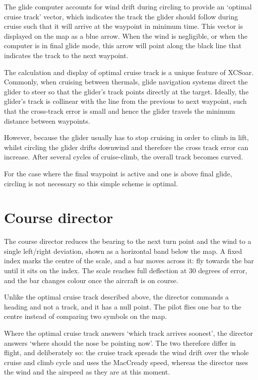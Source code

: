 The glide computer accounts for wind drift during circling to provide
an `optimal cruise track' vector, which indicates the track the glider
should follow during cruise such that it will arrive at the waypoint
in minimum time.  This vector is displayed on the map as a blue arrow.
When the wind is negligible, or when the computer is in final glide
mode, this arrow will point along the black line that indicates the
track to the next waypoint.

The calculation and display of optimal cruise track is a unique
feature of XCSoar.  Commonly, when cruising between thermals, glide
navigation systems direct the glider to steer so that the glider's
track points directly at the target.  Ideally, the glider's track is
collinear with the line from the previous to next waypoint, such that
the cross-track error is small and hence the glider travels the
minimum distance between waypoints.

However, because the glider usually has to stop cruising in order to
climb in lift, whilst circling the glider drifts downwind and
therefore the cross track error can increase.  After several cycles of
cruise-climb, the overall track becomes curved.
%

For the case where the final waypoint is active and one is above final
glide, circling is not necessary so this simple scheme is optimal.


\section{Course director}\label{sec:course-director}

The course director reduces the bearing to the next turn point and the
wind to a single left/right deviation, shown as a horizontal band
below the map.  A fixed index marks the centre of the scale, and a bar
moves across it: fly towards the bar until it sits on the index.  The
scale reaches full deflection at 30 degrees of error, and the bar
changes colour once the aircraft is on course.

Unlike the optimal cruise track described above, the director commands
a heading and not a track, and it has a null point.  The pilot flies
one bar to the centre instead of comparing two symbols on the map.

Where the optimal cruise track answers `which track arrives soonest',
the director answers `where should the nose be pointing now'.  The two
therefore differ in flight, and deliberately so: the cruise track
spreads the wind drift over the whole cruise and climb cycle and uses
the MacCready speed, whereas the director uses the wind and the
airspeed as they are at this moment.

